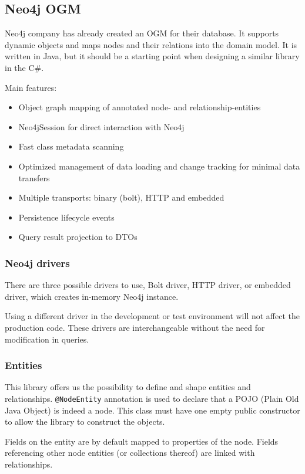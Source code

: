 \subsection {Neo4j OGM}

Neo4j company has already created an OGM for their database. It supports dynamic objects and maps nodes and their relations into the domain model. It is written in Java, but it should be a starting point when designing a similar library in the C\#.

\noindent Main features:
\begin{itemize}
    \item Object graph mapping of annotated node- and relationship-entities
    \item Neo4jSession for direct interaction with Neo4j
    \item Fast class metadata scanning
    \item Optimized management of data loading and change tracking for minimal data transfers
    \item Multiple transports: binary (bolt), HTTP and embedded
    \item Persistence lifecycle events
    \item Query result projection to DTOs
\end{itemize}

\subsubsection {Neo4j drivers}

There are three possible drivers to use, Bolt driver, HTTP driver, or embedded driver, which creates in-memory Neo4j instance.

Using a different driver in the development or test environment will not affect the production code. These drivers are interchangeable without the need for modification in queries.

\subsubsection {Entities}

This library offers us the possibility to define and shape entities and relationships. \texttt{@NodeEntity} annotation is used to declare that a POJO (Plain Old Java Object)
is indeed a node. This class must have one empty public constructor to allow the library to construct the objects.

Fields on the entity are by default mapped to properties of the node. Fields referencing other node entities (or collections thereof) are linked with relationships.

